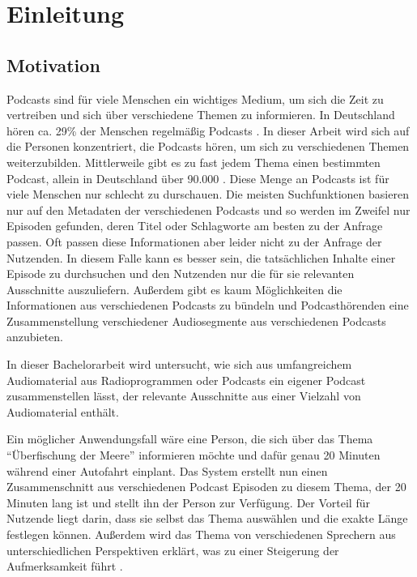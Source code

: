 \chapter{Einleitung}\label{ch:intro}

\section{Motivation}

Podcasts sind für viele Menschen ein wichtiges Medium, um sich die Zeit zu vertreiben und sich über verschiedene Themen zu informieren. 
In Deutschland hören ca. 29\% der Menschen regelmäßig Podcasts \cite{newman2022}.
In dieser Arbeit wird sich auf die Personen konzentriert, die Podcasts hören, um sich zu verschiedenen Themen weiterzubilden.
Mittlerweile gibt es zu fast jedem Thema einen bestimmten Podcast, allein in Deutschland über 90.000 \cite{listennotes}.
Diese Menge an Podcasts ist für viele Menschen nur schlecht zu durschauen.
Die meisten Suchfunktionen basieren nur auf den Metadaten der verschiedenen Podcasts und so werden im Zweifel nur Episoden gefunden, deren Titel oder Schlagworte am besten zu der Anfrage passen.
Oft passen diese Informationen aber leider nicht zu der Anfrage der Nutzenden.
In diesem Falle kann es besser sein, die tatsächlichen Inhalte einer Episode zu durchsuchen und den Nutzenden nur die für sie relevanten Ausschnitte auszuliefern.
Außerdem gibt es kaum Möglichkeiten die Informationen aus verschiedenen Podcasts zu bündeln und Podcasthörenden eine Zusammenstellung verschiedener Audiosegmente aus verschiedenen Podcasts anzubieten.

In dieser Bachelorarbeit wird untersucht, wie sich aus umfangreichem Audiomaterial aus Radioprogrammen oder Podcasts ein eigener Podcast zusammenstellen lässt, der relevante Ausschnitte aus einer Vielzahl von Audiomaterial enthält.

Ein möglicher Anwendungsfall wäre eine Person, die sich über das Thema ``Überfischung der Meere'' informieren möchte und dafür genau 20 Minuten während einer Autofahrt einplant. 
Das System erstellt nun einen Zusammenschnitt aus verschiedenen Podcast Episoden zu diesem Thema, der 20 Minuten lang ist und stellt ihn der Person zur Verfügung. 
Der Vorteil für Nutzende liegt darin, dass sie selbst das Thema auswählen und die exakte Länge festlegen können.
Außerdem wird das Thema von verschiedenen Sprechern aus unterschiedlichen Perspektiven erklärt, was zu einer Steigerung der Aufmerksamkeit führt \cite{kang2012}. 



